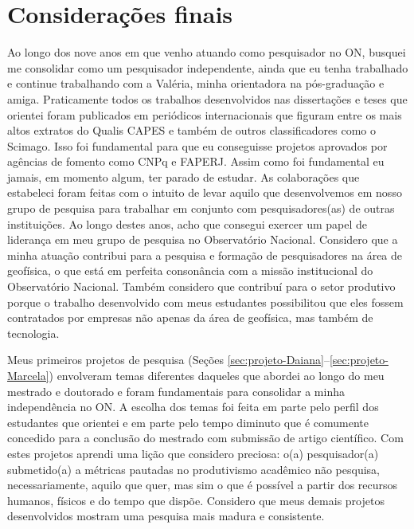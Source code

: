 \renewcommand{\chaptername}{Capítulo}
\chapter{Considerações finais}
\renewcommand{\chaptername}{Considerações finais}
\label{cap:consideracoes-finais}

Ao longo dos nove anos em que venho atuando como pesquisador no ON, 
busquei me consolidar como um pesquisador independente, ainda que eu tenha trabalhado
e continue trabalhando com a Valéria, minha orientadora na pós-graduação e amiga.
Praticamente todos os trabalhos desenvolvidos nas dissertações e teses que 
orientei foram publicados em periódicos internacionais que figuram entre 
os mais altos extratos do Qualis CAPES e também de outros classificadores como
o Scimago.
Isso foi fundamental para que eu conseguisse projetos aprovados por agências de fomento
como CNPq e FAPERJ.
Assim como foi fundamental eu jamais, em momento algum, ter parado de estudar.
As colaborações que estabeleci foram feitas com o intuito de levar aquilo que 
desenvolvemos em nosso grupo de pesquisa para trabalhar em conjunto com 
pesquisadores(as) de outras instituições. 
Ao longo destes anos, acho que consegui exercer um papel de liderança 
em meu grupo de pesquisa no Observatório Nacional.
Considero que a minha atuação contribui para a pesquisa e formação de pesquisadores na 
área de geofísica, o que está em perfeita consonância com a missão institucional do
Observatório Nacional. Também considero que contribuí para o setor produtivo porque
o trabalho desenvolvido com meus estudantes possibilitou que eles fossem contratados
por empresas não apenas da área de geofísica, mas também de tecnologia.

\bigskip

\noindent Meus primeiros projetos de pesquisa 
(Seções \ref{sec:projeto-Daiana}--\ref{sec:projeto-Marcela}) envolveram 
temas diferentes daqueles que abordei ao longo do meu mestrado e doutorado e
foram fundamentais para consolidar a minha independência no ON.
A escolha dos temas foi feita em parte pelo perfil dos 
estudantes que orientei e em parte pelo tempo diminuto que é comumente concedido 
para a conclusão do mestrado com submissão de artigo científico. 
Com estes projetos aprendi uma lição que considero preciosa: o(a) pesquisador(a) 
submetido(a) a métricas pautadas no produtivismo acadêmico não pesquisa, necessariamente, 
aquilo que quer, mas sim o que é possível a partir dos recursos humanos, físicos e do
tempo que dispõe. Considero que meus demais projetos desenvolvidos mostram
uma pesquisa mais madura e consistente.

